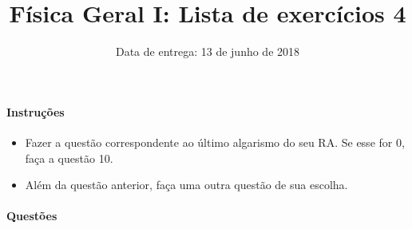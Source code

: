 \documentclass[twocolumn=on,DIV=calc]{scrartcl}
\title{Física Geral I: Lista de exercícios 4}
\author{Data de entrega: 13 de junho de 2018}
\date{}
\begin{document}
\maketitle

\paragraph{Instruções}

\begin{itemize}
\item Fazer a questão correspondente ao último algarismo do seu RA. Se
  esse for $0$, faça a questão 10.
\item Além da questão anterior, faça uma outra questão de sua escolha.
\end{itemize}

\paragraph{Questões}
\end{document}
